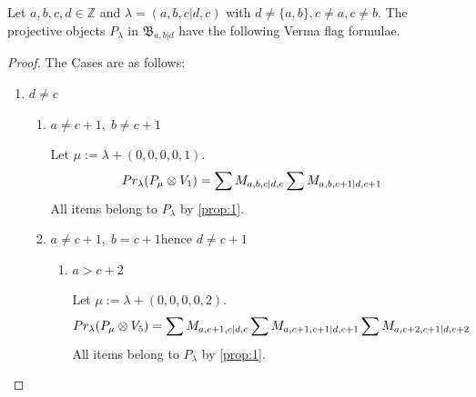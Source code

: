 \begin{theorem}
  Let $a,b,c,d \in \mathbb{Z}$ and $\lambda = (a,b,c|d,c)$ with $d \neq \{a,b\}, c \neq a,c\neq b $. The projective objects $P_{\lambda}$ in $\mathfrak{B}_{a,b|d}$ have the following Verma flag formulae.
\end{theorem}
\begin{proof} The Cases are as follows:\par
\begin{enumerate}
  \item $d \neq c$
    \begin{enumerate}
      \item $a\neq c+1, \; b \neq c+1$ \par
        Let $\mu:=\lambda + (0,0,0,0,1) $.
        \begin{equation}\notag
          \begin{aligned}
            Pr_{\lambda}(P_\mu \otimes V_{1}) &=
\sum M_{a,b,c|d,c}
\sum M_{a,b,c+1|d,c+1}
          \end{aligned}
        \end{equation}
All items belong to $P_\lambda$ by \cref{prop:1}.

      \item $a\neq c+1, \; b=c+1 \text{hence } d \neq c+1 $
        \begin{enumerate}
          \item $a>c+2$ \par
        Let $\mu:=\lambda + (0,0,0,0,2) $.
        \begin{equation}\notag
          \begin{aligned}
            Pr_{\lambda}(P_\mu \otimes V_{5}) &=
\sum M_{a,c+1,c|d,c}
\sum M_{a,c+1,c+1|d,c+1}
\sum M_{a,c+2,c+1|d,c+2}
          \end{aligned}
        \end{equation}
All items belong to $P_\lambda$ by \cref{prop:1}.


\end{enumerate}
\end{enumerate}
\end{enumerate}
\end{proof}
